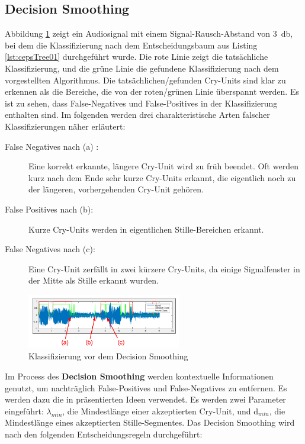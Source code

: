 \subsection{Decision Smoothing}

Abbildung \ref{img:beforeSmoothing} zeigt ein Audiosignal mit einem Signal-Rausch-Abstand von \SI{3}{\decibel}, bei dem die Klassifizierung nach dem Entscheidungsbaum aus Listing \ref{lst:cepsTree01} durchgeführt wurde. Die rote Linie zeigt die tatsächliche Klassifizierung, und die grüne Linie die gefundene Klassifizierung nach dem vorgestellten Algorithmus. Die tatsächlichen/gefunden Cry-Units sind klar zu erkennen als die Bereiche, die von der roten/grünen Linie überspannt werden. Es ist zu sehen, dass False-Negatives und False-Positives in der Klassifizierung enthalten sind. Im folgenden werden drei charakteristische Arten falscher Klassifizierungen näher erläutert:
\begin{description}
	\item [False Negatives nach (a) :] Eine korrekt erkannte, längere Cry-Unit wird zu früh beendet. Oft werden kurz nach dem Ende sehr kurze Cry-Units erkannt, die eigentlich noch zu der längeren, vorhergehenden Cry-Unit gehören.
	\item [False Positives nach (b): ] Kurze Cry-Units werden in eigentlichen Stille-Bereichen erkannt.
	\item [False Negatives nach (c): ] Eine Cry-Unit zerfällt in zwei kürzere Cry-Units, da einige Signalfenster in der Mitte als Stille erkannt wurden.
\end{description}

\begin{figure}[h]
	\centering
	\includegraphics[width=0.6\textwidth]{bilder/smoothing02.png}
	\caption{Klassifizierung vor dem Decision Smoothing}
	\label{img:beforeSmoothing}
\end{figure}

Im Process des \textbf{Decision Smoothing} werden kontextuelle Informationen genutzt, um nachträglich False-Positives und False-Negatives zu entfernen. Es werden dazu die in \cite{vad_entropy} präsentierten Ideen verwendet. Es werden zwei Parameter eingeführt: $\lambda_{min}$, die Mindestlänge einer akzeptierten Cry-Unit, und d$_{min}$, die Mindestlänge eines akzeptierten Stille-Segmentes. Das Decision Smoothing wird nach den folgenden Entscheidungsregeln durchgeführt:


